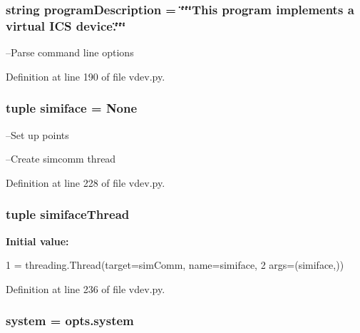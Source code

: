 \subsubsection[{program\+Description}]{\setlength{\rightskip}{0pt plus 5cm}string program\+Description = \char`\"{}\char`\"{}\char`\"{}This program implements {\bf a} virtual I\+C\+S device.\char`\"{}\char`\"{}\char`\"{}}\label{namespacevdev_a638ba7c1243233951e914e5623d8b6b3}


--Parse command line options 



Definition at line 190 of file vdev.\+py.

\subsubsection[{simiface}]{\setlength{\rightskip}{0pt plus 5cm}tuple simiface = None}\label{namespacevdev_a40e2c79edeb2927f4f7bf898d3684e13}


--Set up points 

--Create simcomm thread 

Definition at line 228 of file vdev.\+py.

\subsubsection[{simiface\+Thread}]{\setlength{\rightskip}{0pt plus 5cm}tuple simiface\+Thread}\label{namespacevdev_a001c8a8297a6d12dce7741a7efc62bf3}
{\bfseries Initial value\+:}
\begin{DoxyCode}
1 = threading.Thread(target=simComm, name=simiface, 
2                                                 args=(simiface,))
\end{DoxyCode}


Definition at line 236 of file vdev.\+py.

\subsubsection[{system}]{\setlength{\rightskip}{0pt plus 5cm}system = opts.\+system}\label{namespacevdev_ac4ca86dead4518ac4fd6e30172db3d9e}


